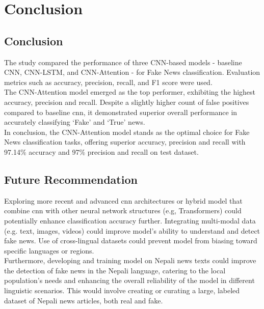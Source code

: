 \chapter{Conclusion}

\section{Conclusion}

The study compared the performance of three CNN-based models - baseline CNN, CNN-LSTM, and CNN-Attention - for Fake News classification. Evaluation metrics such as accuracy, precision, recall, and F1 score were used. \\

The CNN-Attention model emerged as the top performer, exhibiting the highest accuracy, precision and recall. Despite a slightly higher count of false positives compared to baseline \ac{cnn}, it demonstrated superior overall performance in accurately classifying `Fake' and `True' news.\\

In conclusion, the CNN-Attention model stands as the optimal choice for Fake News classification tasks, offering superior accuracy, precision and recall with 97.14\% accuracy and 97\% precision and recall on test dataset.

\section{Future Recommendation}

Exploring more recent and advanced \ac{cnn} architectures or hybrid model that combine \ac{cnn} with other neural network structures (e.g, Transformers) could potentially enhance classification accuracy further. Integrating multi-modal data (e.g. text, images, videos) could improve model's ability to understand and detect fake news. Use of cross-lingual datasets could prevent model from biasing toward specific languages or regions. \\

Furthermore, developing and training model on Nepali news texts could improve the detection of fake news in the Nepali language, catering to the local population's needs and enhancing the overall reliability of the model in different linguistic scenarios. This would involve creating or curating a large,  labeled dataset of Nepali news articles, both real and fake.